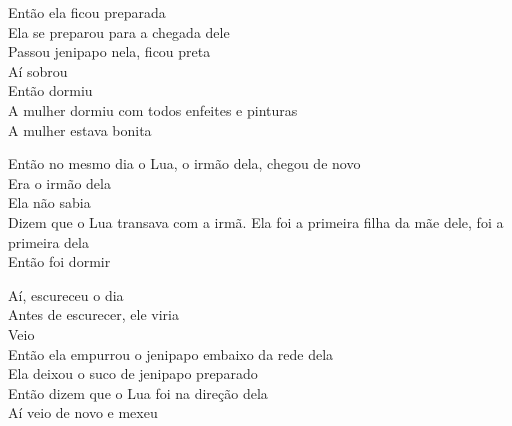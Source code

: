 \bigskip

\begin{linenumbers}
\noindent Então ela ficou preparada\\
Ela se preparou para a chegada dele\\
Passou jenipapo nela, ficou preta\\
Aí sobrou\\
Então dormiu\\
A mulher dormiu com todos enfeites e pinturas\\
A mulher estava bonita
\end{linenumbers}

\bigskip

\begin{linenumbers}
\noindent Então no mesmo dia o Lua, o irmão dela, chegou de novo\\
Era o irmão dela\\
Ela não sabia\\
Dizem que o Lua transava com a irmã. Ela foi a primeira filha da mãe dele, foi a primeira dela\\
Então foi dormir
\end{linenumbers}

\bigskip

\begin{linenumbers}
\noindent Aí, escureceu o dia\\
Antes de escurecer, ele viria\\
Veio\\
Então ela empurrou o jenipapo embaixo da rede dela\\
Ela deixou o suco de jenipapo preparado\\
Então dizem que o Lua foi na direção dela\\
Aí veio de novo e mexeu
\end{linenumbers}

